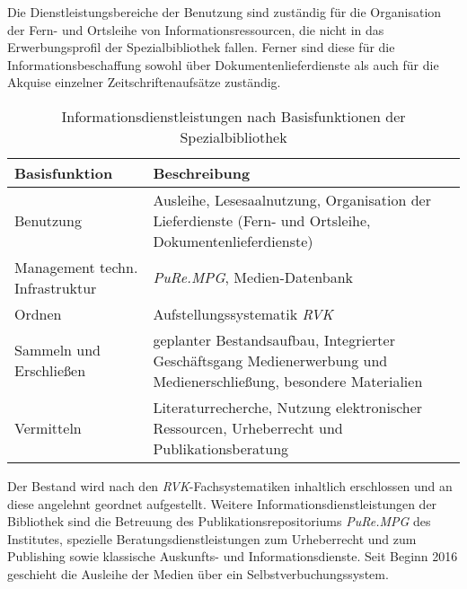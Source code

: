 Die Dienstleistungsbereiche der Benutzung sind zuständig für die Organisation der Fern- und Ortsleihe 
von Informationsressourcen, die nicht in das Erwerbungsprofil der Spezialbibliothek fallen. Ferner sind diese 
für die Informationsbeschaffung sowohl über Dokumentenlieferdienste als auch für die Akquise einzelner Zeitschriftenaufsätze zuständig.

\begingroup
\setlength{\tabcolsep}{12pt} %
\renewcommand{\arraystretch}{1.5} 
\begin{table}[h]
    \centering
    \begin{adjustbox}{max width=\textwidth}
    \begin{tabular}{p{}p{}}
       \toprule
       Basisfunktion                            & Beschreibung\\
       \midrule
        Benutzung                               &Ausleihe, Lesesaalnutzung, Organisation der Lieferdienste (Fern- und Ortsleihe, Dokumentenlieferdienste)\\
        Management techn. Infrastruktur         &\textit{\acrshort{PuRe.MPG}}, Medien-Datenbank\\
        Ordnen                                  &Aufstellungssystematik \textit{\acrshort{RVK}}\\
        Sammeln und Erschließen                 &geplanter Bestandsaufbau, Integrierter Geschäftsgang Medienerwerbung und Medienerschließung, besondere Materialien\\
        Vermitteln                              &Literaturrecherche, Nutzung elektronischer Ressourcen, Urheberrecht und Publikationsberatung\\
   
       \bottomrule
    \end{tabular}
    \end{adjustbox}
    \caption{%
        Informationsdienstleistungen nach Basisfunktionen der Spezialbibliothek
    }
    \label{tab:Informationsdienstleistungen}
    \end{table}
\endgroup

Der Bestand wird nach den \textit{\acrshort{RVK}}-Fachsystematiken inhaltlich erschlossen und an diese angelehnt geordnet aufgestellt.
Weitere Informationsdienstleistungen der Bibliothek sind die Betreuung des Publikationsrepositoriums \textit{\acrshort{PuRe.MPG}} des Institutes, spezielle Beratungsdienstleistungen 
zum Urheberrecht und zum Publishing sowie klassische Auskunfts- und Informationsdienste. Seit Beginn 2016 
geschieht die Ausleihe der Medien über ein Selbstverbuchungssystem.\\

